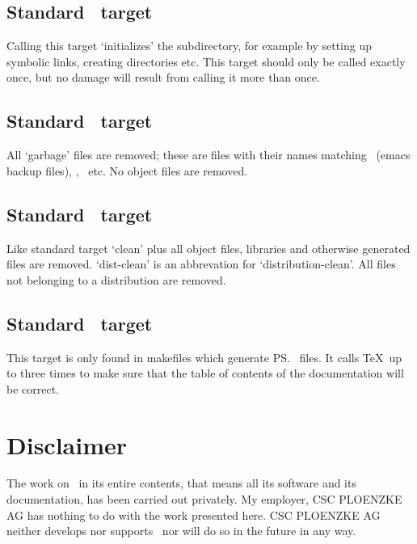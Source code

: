 \subsection*{Standard \protect{}\ target \protect{}}

Calling this target `initializes' the subdirectory, for example by
setting up symbolic links, creating directories etc. This target
should only be called exactly once, but no damage will result from
calling it more than once.

\subsection*{Standard \protect{}\ target \protect{}}

All `garbage' files are removed; these are files with their names
matching \lisp{*\td}\ (emacs backup files), , \
etc. No object files are removed.

\subsection*{Standard \protect{}\ target \protect{}}

Like standard target `clean' plus all object files, libraries and
otherwise generated files are removed. `dist-clean' is an abbrevation
for `distribution-clean'. All files not belonging to a distribution
are removed.

\subsection*{Standard \protect{}\ target \protect{}}

This target is only found in makefiles which generate \ps\ files.
It calls \TeX\ up to three times to make sure that the table of
contents of the documentation will be correct.

\section{Disclaimer}

The work on \plob\ in its entire contents, that means all its software
and its documentation, has been carried out privately. My employer,
CSC PLOENZKE AG has nothing to do with the work presented here. CSC
PLOENZKE AG neither develops nor supports \plob\ nor will do so in the
future in any way.

